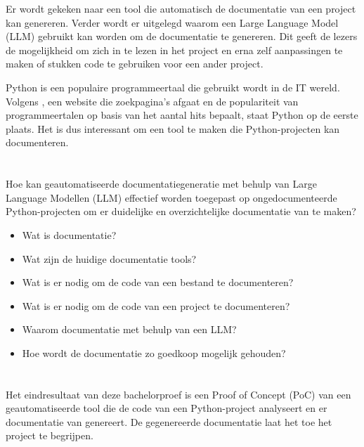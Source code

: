Er wordt gekeken naar een tool die automatisch de documentatie van een project kan genereren.
Verder wordt er uitgelegd waarom een Large Language Model (LLM) gebruikt kan worden om de documentatie te genereren.
Dit geeft de lezers de mogelijkheid om zich in te lezen in het project en erna zelf aanpassingen te maken of stukken code te gebruiken voor een ander project.

Python is een populaire programmeertaal die gebruikt wordt in de IT wereld.
Volgens \textcite{TIOBE2024}, een website die zoekpagina's afgaat en de populariteit van programmeertalen op basis van het aantal hits bepaalt, staat Python op de eerste plaats.
Het is dus interessant om een tool te maken die Python-projecten kan documenteren.

\section{}%
\label{sec:onderzoeksvraag}

Hoe kan geautomatiseerde documentatiegeneratie met behulp van Large Language Modellen (LLM) effectief worden toegepast op ongedocumenteerde Python-projecten om er duidelijke en overzichtelijke documentatie van te maken? 

\begin{itemize}
  \item Wat is documentatie?
  \item Wat zijn de huidige documentatie tools?
  \item Wat is er nodig om de code van een bestand te documenteren?
  \item Wat is er nodig om de code van een project te documenteren?
  \item Waarom documentatie met behulp van een LLM?
  \item Hoe wordt de documentatie zo goedkoop mogelijk gehouden?
\end{itemize}

\section{}%
\label{sec:onderzoeksdoelstelling}

Het eindresultaat van deze bachelorproef is een Proof of Concept (PoC) van een geautomatiseerde tool die de code van een Python-project analyseert en er documentatie van genereert.
De gegenereerde documentatie laat het toe het project te begrijpen.

